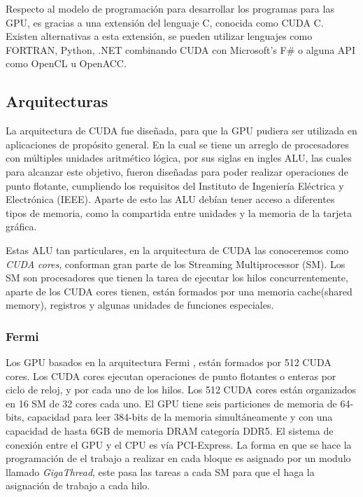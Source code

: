 Respecto al modelo de programación para desarrollar los programas para las GPU, es gracias a una extensión del lenguaje C, conocida como CUDA C. Existen alternativas a esta extensión, se pueden utilizar lenguajes como FORTRAN, Python, .NET combinando CUDA con Microsoft's F\# o alguna API como OpenCL u OpenACC\cite{lenguajes}. 
 

\subsection{Arquitecturas}
La arquitectura de CUDA fue diseñada, para que la GPU pudiera ser utilizada en aplicaciones de propósito general. En la cual se tiene un arreglo de procesadores con múltiples unidades aritmético lógica, por sus siglas en ingles ALU, las cuales para alcanzar este objetivo, fueron diseñadas para poder realizar operaciones de punto flotante, cumpliendo los requisitos del Instituto de Ingeniería Eléctrica y Electrónica (IEEE). Aparte de esto las ALU debían tener acceso a diferentes tipos de memoria, como la compartida entre unidades y la memoria de la tarjeta gráfica. 

Estas ALU tan particulares, en la arquitectura de CUDA las conoceremos como \textit{CUDA cores}, conforman gran parte de los Streaming Multiprocessor (SM). Los SM son procesadores que tienen la tarea de ejecutar los hilos concurrentemente, aparte de los CUDA cores tienen, están formados por una memoria cache(shared memory), registros y algunas unidades de funciones especiales.

\subsubsection{Fermi}

Los GPU basados en la arquitectura Fermi \cite{fermi}, están formados por 512 CUDA cores. Los CUDA cores ejecutan operaciones de punto flotantes o enteras por ciclo de reloj, y por cada uno de los hilos. Los 512 CUDA cores están organizados en 16 SM de 32 cores cada uno. El GPU tiene seis particiones de memoria de 64-bits, capacidad para leer 384-bits de la memoria simultáneamente y con una capacidad de hasta 6GB de memoria DRAM categoría DDR5. El sistema de conexión entre el GPU y el CPU es vía PCI-Express. La forma en que se hace la programación de el trabajo a realizar en cada bloque es asignado por un modulo llamado \textit{GigaThread}, este pasa las tareas a cada SM para que el haga la asignación de trabajo a cada hilo. 

